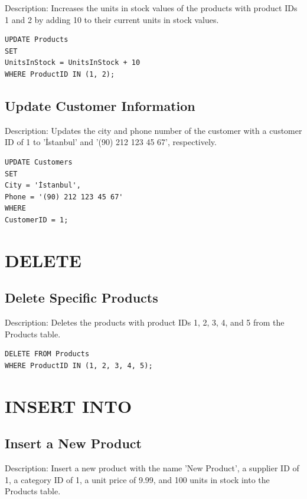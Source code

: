 \documentclass[10pt]{article}
\begin{document}
Description: Increases the units in stock values of the products 
with product IDs 1 and 2 by adding 10 to their current units in stock values.

\begin{verbatim}
UPDATE Products
SET 
UnitsInStock = UnitsInStock + 10
WHERE ProductID IN (1, 2);
\end{verbatim}



\subsection{Update Customer Information}

Description: Updates the city and phone number of the customer with a customer ID 
of 1 to 'İstanbul' and '(90) 212 123 45 67', respectively.

\begin{verbatim}
UPDATE Customers 
SET 
City = 'İstanbul', 
Phone = '(90) 212 123 45 67' 
WHERE 
CustomerID = 1;
\end{verbatim}


\section{DELETE}

\subsection{Delete Specific Products}

Description: Deletes the products with product IDs 1, 2, 3, 4, and 5 from 
the Products table.

\begin{verbatim}
DELETE FROM Products
WHERE ProductID IN (1, 2, 3, 4, 5);
\end{verbatim}


\section{INSERT INTO}

\subsection{Insert a New Product}

Description: Insert a new product with the name 'New Product', 
a supplier ID of 1, a category ID of 1, a unit price of 9.99, and 100 
units in stock into the Products table.
\end{document}
